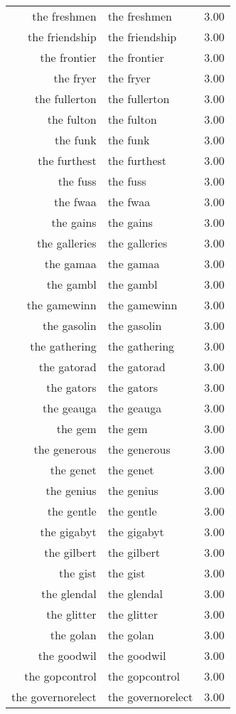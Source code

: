 \begin{table}[ht]
\begin{tabular}{rlr}
  the freshmen & the freshmen & 3.00 \\ 
  the friendship & the friendship & 3.00 \\ 
  the frontier & the frontier & 3.00 \\ 
  the fryer & the fryer & 3.00 \\ 
  the fullerton & the fullerton & 3.00 \\ 
  the fulton & the fulton & 3.00 \\ 
  the funk & the funk & 3.00 \\ 
  the furthest & the furthest & 3.00 \\ 
  the fuss & the fuss & 3.00 \\ 
  the fwaa & the fwaa & 3.00 \\ 
  the gains & the gains & 3.00 \\ 
  the galleries & the galleries & 3.00 \\ 
  the gamaa & the gamaa & 3.00 \\ 
  the gambl & the gambl & 3.00 \\ 
  the gamewinn & the gamewinn & 3.00 \\ 
  the gasolin & the gasolin & 3.00 \\ 
  the gathering & the gathering & 3.00 \\ 
  the gatorad & the gatorad & 3.00 \\ 
  the gators & the gators & 3.00 \\ 
  the geauga & the geauga & 3.00 \\ 
  the gem & the gem & 3.00 \\ 
  the generous & the generous & 3.00 \\ 
  the genet & the genet & 3.00 \\ 
  the genius & the genius & 3.00 \\ 
  the gentle & the gentle & 3.00 \\ 
  the gigabyt & the gigabyt & 3.00 \\ 
  the gilbert & the gilbert & 3.00 \\ 
  the gist & the gist & 3.00 \\ 
  the glendal & the glendal & 3.00 \\ 
  the glitter & the glitter & 3.00 \\ 
  the golan & the golan & 3.00 \\ 
  the goodwil & the goodwil & 3.00 \\ 
  the gopcontrol & the gopcontrol & 3.00 \\ 
  the governorelect & the governorelect & 3.00 \\ 

\end{tabular}
\end{table}
